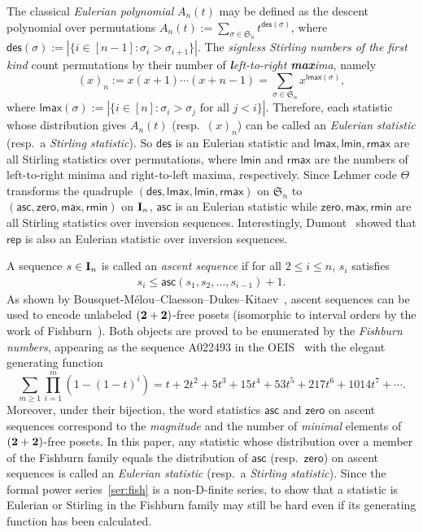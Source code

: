 \documentclass[12pt]{amsart}
\theoremstyle{plain}
\theoremstyle{definition}
\theoremstyle{example}
\theoremstyle{remark}
\numberwithin{equation}{section}
\numberwithin{figure}{section}
\newcommand\des{\mathop{\rm des}}
\def\des{\mathsf{des}}
\newcommand{\asc}{\mathsf{asc}}
\def\max{\mathsf{max}}
\def\zero{\mathsf{zero}}
\def\rep{\mathsf{rep}}
\def\rmin{\mathsf{rmin}}
\def\lmax{\mathsf{lmax}}
\def\lmin{\mathsf{lmin}}
\def\rmax{\mathsf{rmax}}
\def\I{\operatorname{{\bf I}}}
\def\S{\mathfrak{S}}
\begin{document}
The classical {\em Eulerian polynomial} $A_n(t)$ may be defined as the descent polynomial over permutations
$A_n(t):=\sum_{\sigma\in\S_n}t^{\des(\sigma)}$, where $\des(\sigma):=|\{i\in[n-1]: \sigma_i>\sigma_{i+1}\}|$.
The  {\em signless Stirling numbers of the first kind} count permutations by their number of {\em {\bf\em l}eft-to-right {\bf\em max}ima}, namely
$$
(x)_n:=x(x+1)\cdots(x+n-1)=\sum_{\sigma\in\S_n}x^{\lmax(\sigma)},
$$
where $\lmax(\sigma):=|\{i\in[n]:\sigma_i>\sigma_j\text{ for all $j<i$}\}|$. Therefore, each statistic whose distribution  gives $A_n(t)$ (resp.~$(x)_n$) can be called an {\em Eulerian statistic} (resp.~a {\em Stirling statistic}). So $\des$ is an Eulerian statistic and $\lmax,\lmin,\rmax$ are all Stirling statistics over permutations, where  $\lmin$ and $\rmax$ are   the numbers of left-to-right minima  and right-to-left maxima, respectively. Since Lehmer code $\Theta$ transforms the quadruple $(\des,\lmax,\lmin,\rmax)$ on $\S_n$ to $(\asc,\zero,\max,\rmin)$ on $\I_n$, $\asc$ is an Eulerian statistic while $\zero,\max,\rmin$ are all Stirling statistics over inversion sequences. Interestingly, Dumont~\cite{du} showed that $\rep$ is also an Eulerian statistic over inversion sequences.




A sequence $s\in\I_n$ is called an {\em ascent sequence} if for all $2\leq i\leq n$, $s_i$ satisfies
\begin{align*}
s_i\leq \asc(s_1,s_2,\ldots, s_{i-1})+1.
\end{align*}
As shown by Bousquet-M\'elou--Claesson--Dukes--Kitaev~\cite{bcdk},
ascent sequences can be used to encode unlabeled $({\bf2+2})$-free posets (isomorphic to interval orders by the work of Fishburn~\cite{fi1,fi2}).  Both objects are proved to be enumerated by the {\em Fishburn numbers}, appearing as the sequence A022493 in the OEIS~\cite{oeis} with the elegant generating function
 \begin{equation}\label{ser:fish}
 \sum_{m\geq1}\prod_{i=1}^m(1-(1-t)^i)=t+2t^2+5t^3+15t^4+53t^5+217t^6+1014t^7+\cdots.
 \end{equation}
 Moreover, under their bijection, the word statistics $\asc$ and $\zero$ on ascent sequences  correspond to the {\em magnitude} and the number of {\em minimal} elements of $({\bf2+2})$-free posets. In this paper, any statistic whose distribution over  a member of the Fishburn family equals the distribution of $\asc$ (resp.~$\zero$) on ascent sequences is called an {\em Eulerian statistic} (resp.~a {\em Stirling statistic}). Since the formal power series~\eqref{ser:fish} is a non-D-finite series, to show that a statistic is Eulerian or Stirling in the Fishburn family may  still be hard even if  its generating function has been calculated.
\end{document}
